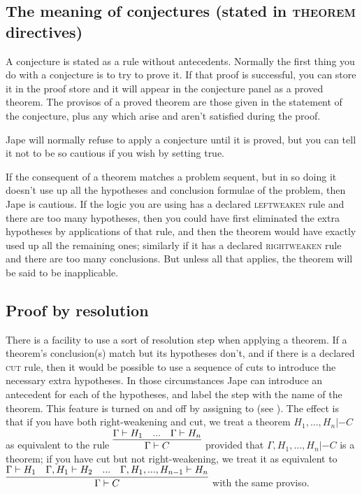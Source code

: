 \subsection{The meaning of conjectures (stated in \textsc{theorem} directives)}

A conjecture is stated as a rule without antecedents. Normally the first thing you do with a conjecture is to try to prove it. If that proof is successful, you can store it in the proof store and it will appear in the conjecture panel as a proved theorem. The provisos of a proved theorem are those given in the statement of the conjecture, plus any which arise and aren't satisfied during the proof.

Jape will normally refuse to apply a conjecture until it is proved, but you can tell it not to be so cautious if you wish by setting  true.

If the consequent of a theorem matches a problem sequent, but in so doing it doesn't use up all the hypotheses and conclusion formulae of the problem, then Jape is cautious. If the logic you are using has a declared \textsc{leftweaken} rule and there are too many hypotheses, then you could have first eliminated the extra hypotheses by applications of that rule, and then the theorem would have exactly used up all the remaining ones; similarly if it has a declared \textsc{rightweaken} rule and there are too many conclusions. But unless all that applies, the theorem will be said to be inapplicable.

\subsection{Proof by resolution}

There is a facility to use a sort of resolution step when applying a theorem. If a theorem's conclusion(s) match but its hypotheses don't, and if there is a declared \textsc{cut} rule, then it would be possible to use a sequence of cuts to introduce the necessary extra hypotheses. In those circumstances Jape can introduce an antecedent for each of the hypotheses, and label the step with the name of the theorem. This feature is turned on and off by assigning to  (see ). The effect is that if you have both right-weakening and cut, we treat a theorem $H_{1},...,H_{n}  |- C$ as equivalent to the rule $\infer{\Gamma  |- C}{\Gamma  |- H_{1} & ... & \Gamma  |- H_{n} } $ provided that $\Gamma,H_{1},...,H_{n}  |- C$ is a theorem; if you have cut but not right-weakening, we treat it as equivalent to $\infer{\Gamma  |- C} {\Gamma  |- H_{1} & \Gamma,H_{1}  |- H_{2} & ... & \Gamma,H_{1},...,H_{n-1}  |- H_{n} }$ with the same proviso.

